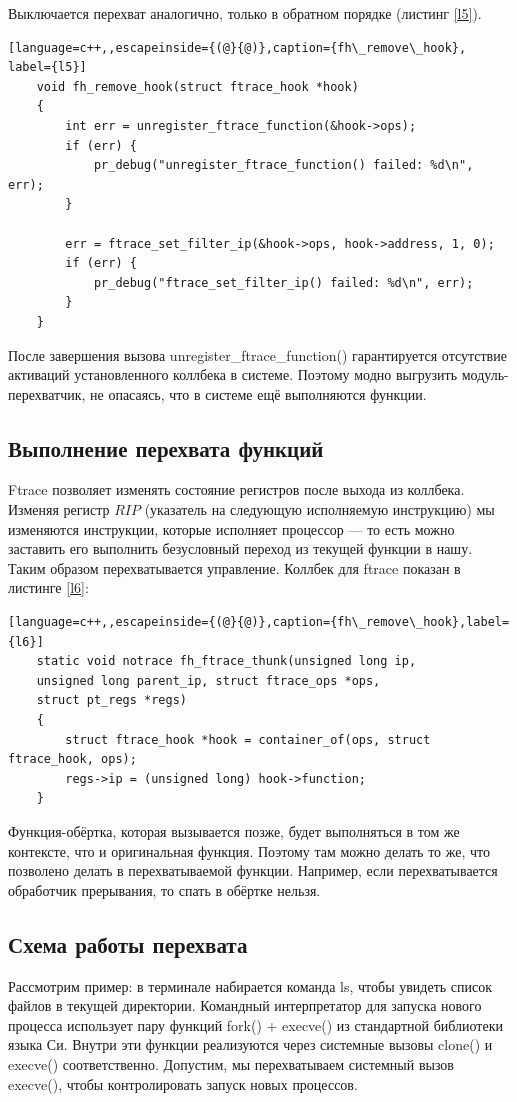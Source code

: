 Выключается перехват аналогично, только в обратном порядке (листинг \ref{l5}).
\begin{lstlisting}[language=c++,,escapeinside={(@}{@)},caption={fh\_remove\_hook}, label={l5}]
	void fh_remove_hook(struct ftrace_hook *hook)
	{
		int err = unregister_ftrace_function(&hook->ops);
		if (err) {
			pr_debug("unregister_ftrace_function() failed: %d\n", err);
		}
		
		err = ftrace_set_filter_ip(&hook->ops, hook->address, 1, 0);
		if (err) {
			pr_debug("ftrace_set_filter_ip() failed: %d\n", err);
		}
	}
\end{lstlisting}

После завершения вызова unregister\_ftrace\_function() гарантируется отсутствие активаций установленного коллбека в системе. Поэтому модно выгрузить модуль-перехватчик, не опасаясь, что в системе ещё выполняются функции.

\subsection{Выполнение перехвата функций}

Ftrace позволяет изменять состояние регистров после выхода из коллбека. Изменяя регистр $RIP$ (указатель на следующую исполняемую инструкцию) мы изменяются инструкции, которые исполняет процессор — то есть можно заставить его выполнить безусловный переход из текущей функции в нашу. Таким образом перехватывается управление. Коллбек для ftrace показан в листинге \ref{l6}:
\begin{lstlisting}[language=c++,,escapeinside={(@}{@)},caption={fh\_remove\_hook},label={l6}]
	static void notrace fh_ftrace_thunk(unsigned long ip, 
	unsigned long parent_ip, struct ftrace_ops *ops, 
	struct pt_regs *regs)
	{
		struct ftrace_hook *hook = container_of(ops, struct ftrace_hook, ops);
		regs->ip = (unsigned long) hook->function;
	}
\end{lstlisting}

Функция-обёртка, которая вызывается позже, будет выполняться в том же контексте, что и оригинальная функция. Поэтому там можно делать то же, что позволено делать в перехватываемой функции. Например, если перехватывается обработчик прерывания, то спать в обёртке нельзя.

\newpage
\subsection{Схема работы перехвата}

Рассмотрим пример: в терминале набирается команда ls, чтобы увидеть список файлов в текущей директории. Командный интерпретатор для запуска нового процесса использует пару функций fork() + execve() из стандартной библиотеки языка Си. Внутри эти функции реализуются через системные вызовы clone() и execve() соответственно. Допустим, мы перехватываем системный вызов execve(), чтобы контролировать запуск новых процессов.

